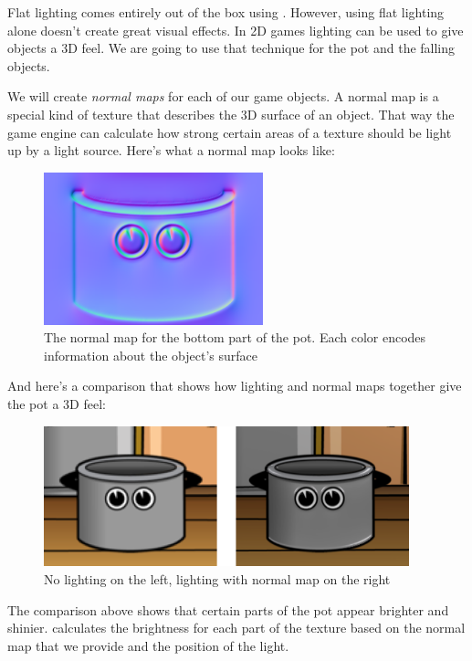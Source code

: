 Flat lighting comes entirely out of the box using \cocos{}. However, using flat
lighting alone doesn't create great visual effects. In 2D games lighting can be
used to give objects a 3D feel. We are going to use that technique for the pot
and the falling objects.

We will create \textit{normal maps} for each of our game objects. A normal map
is a special kind of texture that describes the 3D surface of an object. That
way the game engine can calculate how strong certain areas of a texture should
be light up by a light source. Here's what a normal map looks like:

\begin{figure}[H]
    \centering
    \includegraphics[width=180pt]{images/Chapter9/pot-bottom_NRM.png}
    \caption{The normal map for the bottom part of the pot. Each color encodes
    information about the object's surface}
\end{figure}

And here's a comparison that shows how lighting and normal maps together give
the pot a 3D feel:

\begin{figure}[H]
    \centering
    \includegraphics[width=300pt]{images/Chapter9/pot_lighting_comparison.png}
    \caption{No lighting on the left, lighting with normal map on the right}
\end{figure}

The comparison above shows that certain parts of the pot appear brighter and
shinier. \cocos{} calculates the brightness for each part of the texture based
on the normal map that we provide and the position of the light. 

